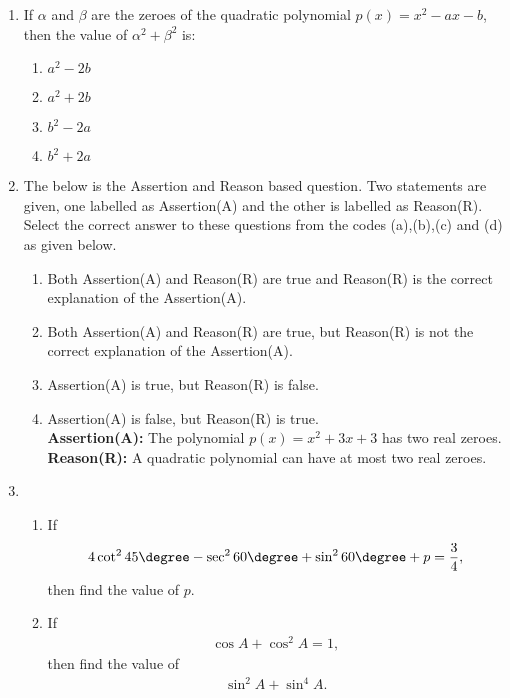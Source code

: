 
%


\begin{enumerate}

\item If $\alpha$ and $\beta$ are the zeroes of the quadratic polynomial $p(x)=x^2-ax-b$, then the value of $\alpha^2 + \beta^2$ is:


\begin{enumerate}
\item $a^2-2b$
\item $a^2+2b$
\item $b^2-2a$
\item $b^2+2a$
\end{enumerate}

\item The below is the Assertion and Reason based question. Two statements are given, one labelled as Assertion(A) and the other is labelled as Reason(R). Select the correct answer to these questions from the codes (a),(b),(c) and (d) as given below.
\begin{enumerate}
\item Both Assertion(A) and Reason(R) are true and Reason(R) is the correct explanation of the Assertion(A).
\item Both Assertion(A) and Reason(R) are true, but Reason(R) is not the correct explanation of the Assertion(A).
\item Assertion(A) is true, but Reason(R) is false.
\item Assertion(A) is false, but Reason(R) is true.\\ 
\textbf{Assertion(A):} The polynomial $p(x)=x^2+3x+3$ has two real zeroes.\\
\textbf{Reason(R):} A quadratic polynomial can have at most two real zeroes.

\end{enumerate}

\item
\begin{enumerate}
\item If 
\begin{align}
    4\cot^2 45\degree - \sec^2 60\degree + \sin^2 60\degree + p = \frac{3}{4}, 
\end{align}
then find the value of $p$.
\item If 
\begin{align}
    \cos A+ \cos^2A=1,
\end{align}then find the value of 
\begin{align}
\sin^2A+\sin^4A.
\end{align}
\end{enumerate}



\end{enumerate}
